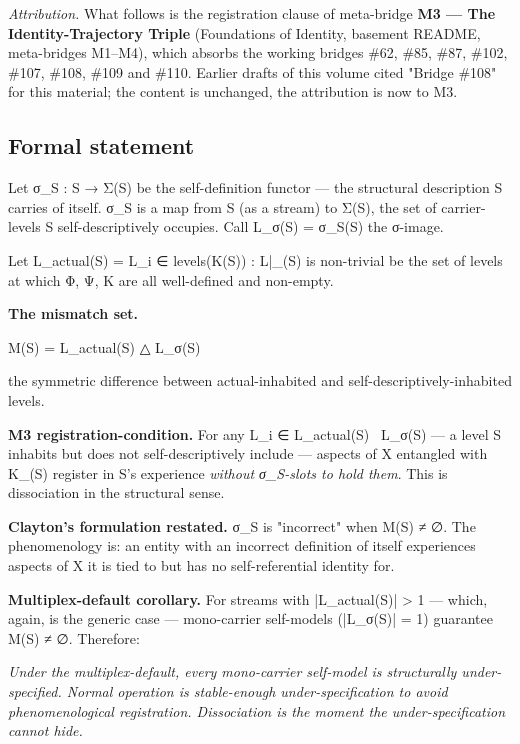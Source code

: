 \documentclass[11pt, openany]{book}
\renewenvironment{quote}{\begin{quoting}}{\end{quoting}}
\begin{document}
\textit{Attribution.} What follows is the registration clause of meta-bridge \textbf{M3 --- The Identity-Trajectory Triple} (Foundations of Identity, basement README, meta-bridges M1–M4), which absorbs the working bridges \#62, \#85, \#87, \#102, \#107, \#108, \#109 and \#110. Earlier drafts of this volume cited "Bridge \#108" for this material; the content is unchanged, the attribution is now to M3.

\subsection{Formal statement}

Let σ\_\allowbreak{}S : S → Σ(S) be the self-definition functor --- the structural description S carries of itself. σ\_\allowbreak{}S is a map from S (as a stream) to Σ(S), the set of carrier-levels S self-descriptively occupies. Call L\_\allowbreak{}σ(S) = σ\_\allowbreak{}S(S) the σ-image.

Let L\_\allowbreak{}actual(S) = { L\_\allowbreak{}i ∈ levels(Κ(S)) : L|\_(S) is non-trivial } be the set of levels at which Φ, Ψ, Κ are all well-defined and non-empty.

\textbf{The mismatch set.}
\begin{Code}
M(S) = L_actual(S) △ L_σ(S)
\end{Code}
the symmetric difference between actual-inhabited and self-descriptively-inhabited levels.

\textbf{M3 registration-condition.} For any L\_\allowbreak{}i ∈ L\_\allowbreak{}actual(S) \ L\_\allowbreak{}σ(S) --- a level S inhabits but does not self-descriptively include --- aspects of X entangled with Κ\_(S) register in S's experience \textit{without σ\_\allowbreak{}S-slots to hold them}. This is dissociation in the structural sense.

\textbf{Clayton's formulation restated.} σ\_\allowbreak{}S is "incorrect" when M(S) ≠ ∅. The phenomenology is: an entity with an incorrect definition of itself experiences aspects of X it is tied to but has no self-referential identity for.

\textbf{Multiplex-default corollary.} For streams with |L\_\allowbreak{}actual(S)| > 1 --- which, again, is the generic case --- mono-carrier self-models (|L\_\allowbreak{}σ(S)| = 1) guarantee M(S) ≠ ∅. Therefore:

\begin{quote}
\textit{Under the multiplex-default, every mono-carrier self-model is structurally under-specified. Normal operation is stable-enough under-specification to avoid phenomenological registration. Dissociation is the moment the under-specification cannot hide.}
\end{quote}
\end{document}
